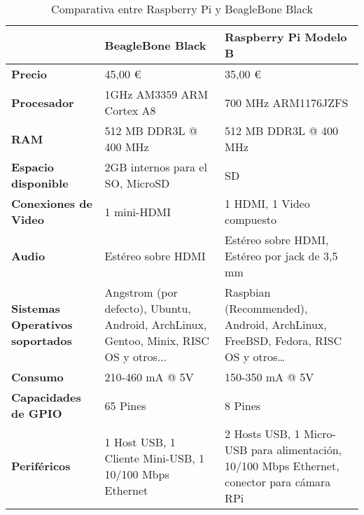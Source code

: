 \begin{table}[tbp]
    \begin{tabular}{p{2.5cm}p{5cm}p{5cm}}
        \toprule
                                                         & \textbf{BeagleBone Black}                                                             & \textbf{Raspberry Pi Modelo B} \\ \midrule
        \textbf{Precio}                         & 45,00 \euro                                                                               & 35,00 \euro \\ \midrule
        \textbf{Procesador}                     & 1GHz AM3359 ARM Cortex A8                                                             & 700 MHz ARM1176JZFS \\ \midrule
        \textbf{RAM}                            & 512 MB DDR3L @ 400 MHz                                                                & 512 MB DDR3L @ 400 MHz \\ \midrule
        \textbf{Espacio disponible}                 & 2GB internos para el SO, MicroSD                                                      & SD \\ \midrule
        \textbf{Conexiones de Video}            & 1 mini-HDMI                                                                           & 1 HDMI, 1 Video compuesto \\ \midrule
        \textbf{Audio}                          & Estéreo sobre HDMI                                                                    & Estéreo sobre HDMI, Estéreo por jack de 3,5 mm \\ \midrule
        \textbf{Sistemas Operativos soportados} & Angstrom (por defecto), Ubuntu, Android, ArchLinux, Gentoo, Minix, RISC OS y otros... & Raspbian (Recommended), Android, ArchLinux, FreeBSD, Fedora, RISC OS y otros… \\\midrule
        \textbf{Consumo}                        & 210-460 mA @ 5V                                                                       & 150-350 mA @ 5V \\ \midrule
        \textbf{Capacidades de GPIO}            & 65 Pines                                                                              & 8 Pines \\ \midrule
        \textbf{Periféricos}                    & 1 Host  USB, 1 Cliente Mini-USB, 1 10/100 Mbps Ethernet                               & 2 Hosts  USB, 1 Micro-USB para alimentación, 10/100 Mbps Ethernet, conector para cámara RPi \\ \bottomrule
    \end{tabular}
    \caption{Comparativa entre Raspberry Pi y BeagleBone Black}
    \label{tab:comp_rpi_bbb}
\end{table}





